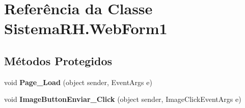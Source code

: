 \hypertarget{class_sistema_r_h_1_1_web_form1}{
\section{Referência da Classe SistemaRH.WebForm1}
\label{class_sistema_r_h_1_1_web_form1}
}
\subsection*{Métodos Protegidos}
\begin{DoxyCompactItemize}
\item 
\hypertarget{class_sistema_r_h_1_1_web_form1_ae339ad04b2b45971de6f972e53f9549d}{
void {\bfseries Page\_\-Load} (object sender, EventArgs e)}
\label{class_sistema_r_h_1_1_web_form1_ae339ad04b2b45971de6f972e53f9549d}

\item 
\hypertarget{class_sistema_r_h_1_1_web_form1_a0724e9155a58d4667857bb1e557e921e}{
void {\bfseries ImageButtonEnviar\_\-Click} (object sender, ImageClickEventArgs e)}
\label{class_sistema_r_h_1_1_web_form1_a0724e9155a58d4667857bb1e557e921e}

\end{DoxyCompactItemize}
